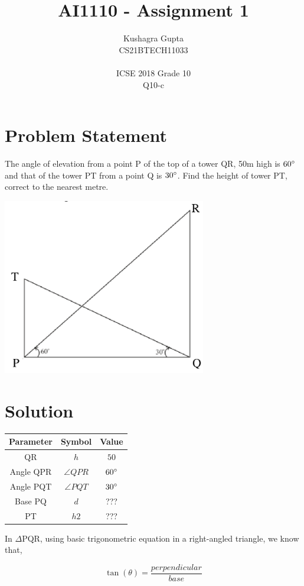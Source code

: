 \documentclass[journal,12pt,twocolumn]{IEEEtran}
\title{AI1110 - Assignment 1}
\author{Kushagra Gupta \\ \normalsize CS21BTECH11033 \\ \vspace*{20pt}\\ \vspace*{20pt} \Large ICSE 2018 Grade 10 \\ \large Q10-c}
\date{}
\begin{document}
\maketitle 
\section*{Problem Statement}

\noindent The angle of elevation from a point P of the top of a tower QR, 50m high is $60\degree$ and that of the
tower PT from a point Q is $30\degree$. Find the height of tower PT, correct to the nearest metre.

\begin{center}
\includegraphics[width=252pt]{figure.png}
\end{center}
\section*{Solution}
\vspace{3pt}
\begin{tabular}{|c|c|c|}
\hline
\textbf{Parameter} & \textbf{Symbol} & \textbf{Value} \\
\hline
QR & $h$ & $50$ \\
\hline
Angle QPR & $\angle QPR$ & $60\degree$ \\
\hline
Angle PQT & $\angle PQT$ & $30\degree$ \\
\hline
Base PQ & $d$ & ??? \\
\hline
PT & $h2$ & ??? \\
\hline
\end{tabular}

\noindent In $\Delta$PQR, using basic trigonometric equation in a right-angled triangle, we know that,

\begin{equation}
    \tan(\theta)=\frac{perpendicular}{base}
\end{equation}
\end{document}
